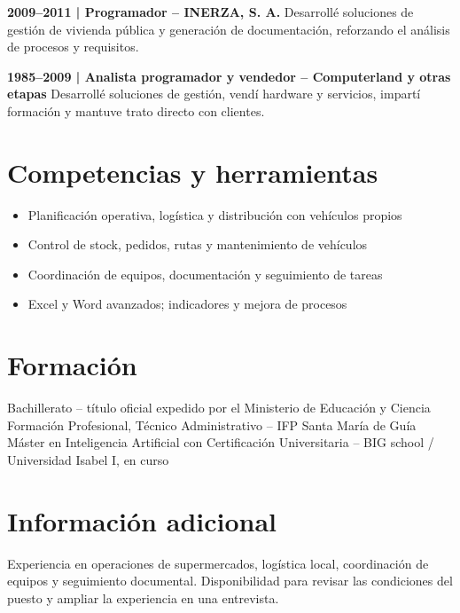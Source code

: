 \documentclass[11pt,a4paper]{article}
\begin{document}
\textbf{2009--2011 | Programador -- INERZA, S. A.} Desarrollé soluciones de gestión de vivienda pública y generación de documentación, reforzando el análisis de procesos y requisitos.

\textbf{1985--2009 | Analista programador y vendedor -- Computerland y otras etapas} Desarrollé soluciones de gestión, vendí hardware y servicios, impartí formación y mantuve trato directo con clientes.
\section*{Competencias y herramientas}
\begin{itemize}[leftmargin=*]
\item Planificación operativa, logística y distribución con vehículos propios
\item Control de stock, pedidos, rutas y mantenimiento de vehículos
\item Coordinación de equipos, documentación y seguimiento de tareas
\item Excel y Word avanzados; indicadores y mejora de procesos
\end{itemize}
\section*{Formación}
Bachillerato -- título oficial expedido por el Ministerio de Educación y Ciencia\\
Formación Profesional, Técnico Administrativo -- IFP Santa María de Guía\\
Máster en Inteligencia Artificial con Certificación Universitaria -- BIG school / Universidad Isabel I, en curso
\section*{Información adicional}
Experiencia en operaciones de supermercados, logística local, coordinación de equipos y seguimiento documental. Disponibilidad para revisar las condiciones del puesto y ampliar la experiencia en una entrevista.
\end{document}
